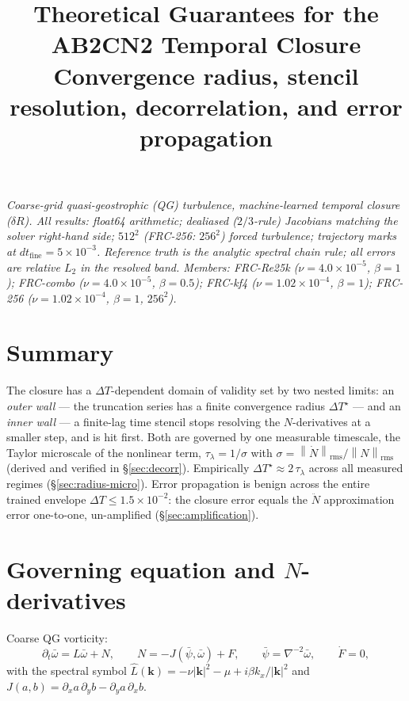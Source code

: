 \documentclass[11pt]{article}
\title{Theoretical Guarantees for the AB2CN2 Temporal Closure\\
\large Convergence radius, stencil resolution, decorrelation, and error propagation}
\author{}
\date{}
\theoremstyle{remark}
\newcommand{\wbar}{\bar{\omega}}
\newcommand{\pbar}{\bar{\psi}}
\newcommand{\DT}{\Delta T}
\newcommand{\DTs}{\Delta T^{\star}}
\newcommand{\taul}{\tau_{\lambda}}
\newcommand{\norm}[1]{\left\lVert #1 \right\rVert}
\begin{document}
\maketitle

\begin{center}
\begin{minipage}{0.92\textwidth}
\small\itshape
Coarse-grid quasi-geostrophic (QG) turbulence, machine-learned temporal
closure ($\delta R$). All results: float64 arithmetic; dealiased
($2/3$-rule) Jacobians matching the solver right-hand side; $512^2$
(FRC-256: $256^2$) forced turbulence; trajectory marks at
$dt_{\mathrm{fine}} = 5\times10^{-3}$. Reference truth is the analytic
spectral chain rule; all errors are relative $L_2$ in the resolved band.
Members: FRC-Re25k ($\nu = 4.0\times10^{-5}$, $\beta = 1$); FRC-combo
($\nu = 4.0\times10^{-5}$, $\beta = 0.5$); FRC-kf4
($\nu = 1.02\times10^{-4}$, $\beta = 1$); FRC-256
($\nu = 1.02\times10^{-4}$, $\beta = 1$, $256^2$).
\end{minipage}
\end{center}

\section*{Summary}

The closure has a $\DT$-dependent domain of validity set by two nested
limits: an \emph{outer wall} --- the truncation series has a finite
convergence radius $\DTs$ --- and an \emph{inner wall} --- a finite-lag time
stencil stops resolving the $N$-derivatives at a smaller step, and is hit
first. Both are governed by one measurable timescale, the Taylor microscale
of the nonlinear term, $\taul = 1/\sigma$ with
$\sigma = \norm{\dot N}_{\mathrm{rms}}/\norm{N}_{\mathrm{rms}}$
(derived and verified in \S\ref{sec:decorr}). Empirically
$\DTs \approx 2\,\taul$ across all measured regimes
(\S\ref{sec:radius-micro}). Error propagation is benign across the entire
trained envelope $\DT \le 1.5\times10^{-2}$: the closure error equals the
$\ddot N$ approximation error one-to-one, un-amplified
(\S\ref{sec:amplification}).

\section{Governing equation and $N$-derivatives}\label{sec:setup}

Coarse QG vorticity:
\begin{equation}
\partial_t \wbar = L\wbar + N, \qquad
N = -J(\pbar, \wbar) + F, \qquad
\pbar = \nabla^{-2}\wbar, \qquad \dot F = 0,
\end{equation}
with the spectral symbol
$\hat L(\mathbf{k}) = -\nu|\mathbf{k}|^2 - \mu + i\beta k_x/|\mathbf{k}|^2$
and $J(a,b) = \partial_x a\,\partial_y b - \partial_y a\,\partial_x b$.
\end{document}
